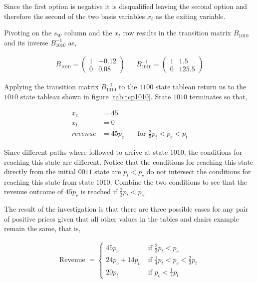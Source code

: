 Since the first option is negative it is disqualified leaving the second option and therefore the second of the two basis variables $x_t$ as the exiting variable. 

Pivoting on the $s_W$ column and the $x_t$ row results in the transition matrix $B_{1010}$ and its inverse $B_{1010}^{-1}$ as,

\begin{align*}
B_{1010} = \begin{pmatrix}1&-0.12\\0&0.08\end{pmatrix} && 
B_{1010}^{-1} = \begin{pmatrix}1&1.5\\0&125.5\end{pmatrix}
\end{align*}

Applying the transition matrix $B_{1010}^{-1}$ to the $1100$ state tableau return us to the $1010$ state tableau shown in figure \ref{tab:tcp1010}.  State $1010$ terminates so that,

\begin{align*}
x_c &= 45\\
x_t &= 0\\
revenue &= 45p_c && \text{ for } \frac{2}{3}p_t < p_c < p_t
\end{align*}

Since different paths where followed to arrive at state $1010$, the conditions for reaching this state are different. Notice that the conditions for reaching this state directly from the initial $0011$ state are $p_t < p_c$ do not intersect the conditions for reaching this state from state $1010$. Combine the two conditions to see that the revenue outcome of $45p_c$ is reached if $\frac{2}{3}p_t < p_c$.

The result of the investigation is that there are three possible cases for any pair of positive prices given that all other values in the tables and chairs example remain the same, that is,

\begin{align*}
\text{Revenue } = \begin{cases}45p_c & \text{ if } \frac{2}{3}p_t < p_c\\
  24p_c + 14p_t & \text{ if } \frac{1}{4}p_t < p_c < \frac{2}{3}p_t\\
  20p_t & \text{ if } p_c < \frac{1}{4}p_t\end{cases}
\end{align*}

